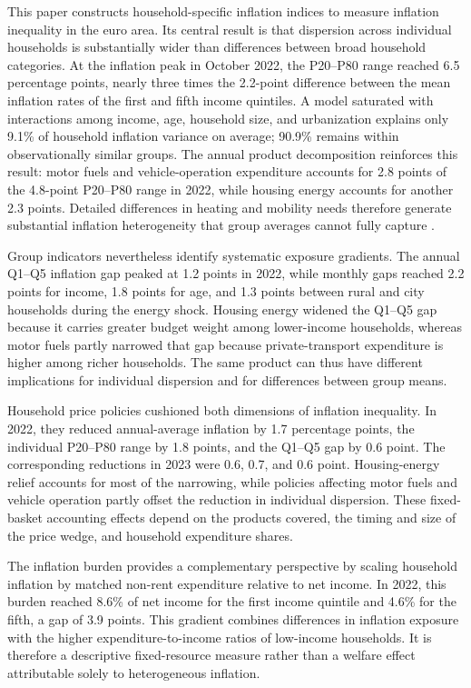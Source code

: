 \documentclass[11pt]{article}
\begin{document}
This paper constructs household-specific inflation indices to measure inflation inequality in the
euro area. Its central result is that dispersion across individual households is substantially wider
than differences between broad household categories. At the inflation peak in October 2022, the
P20--P80 range reached 6.5 percentage points, nearly three times the 2.2-point difference between the
mean inflation rates of the first and fifth income quintiles. A model saturated with interactions
among income, age, household size, and urbanization explains only 9.1\% of household
inflation variance on average; 90.9\% remains within observationally similar groups. The annual
product decomposition reinforces this result: motor fuels and vehicle-operation expenditure
accounts for 2.8 points of the 4.8-point P20--P80 range in 2022, while housing energy accounts for
another 2.3 points. Detailed differences in heating and
mobility needs therefore generate substantial inflation heterogeneity that group averages cannot
fully capture \citep{oflaherty2026grocery}.

Group indicators nevertheless identify systematic exposure gradients. The annual Q1--Q5 inflation
gap peaked at 1.2 points in 2022, while monthly gaps reached 2.2 points for income, 1.8 points for age,
and 1.3 points between rural and city households during the energy shock. Housing energy widened
the Q1--Q5 gap because it carries greater budget weight among lower-income households, whereas motor
fuels partly narrowed that gap because private-transport expenditure is higher among richer
households. The same product can thus have different implications for individual dispersion and for
differences between group means.

Household price policies cushioned both dimensions of inflation inequality. In 2022, they reduced
annual-average inflation by 1.7 percentage points, the individual P20--P80 range by 1.8 points, and
the Q1--Q5 gap by 0.6 point. The corresponding reductions in 2023 were 0.6, 0.7, and 0.6 point.
Housing-energy relief accounts for most of the narrowing, while policies affecting motor fuels
and vehicle operation partly offset the reduction in individual dispersion. These fixed-basket accounting
effects depend on the products covered, the timing and size of the price wedge, and household
expenditure shares.

The inflation burden provides a complementary perspective by scaling household inflation by matched
non-rent expenditure relative to net income. In 2022, this burden reached 8.6\% of net income for the
first income quintile and 4.6\% for the fifth, a gap of 3.9 points. This gradient combines differences
in inflation exposure with the higher expenditure-to-income ratios of low-income households. It is
therefore a descriptive fixed-resource measure rather than a welfare effect attributable solely to
heterogeneous inflation.
\end{document}
